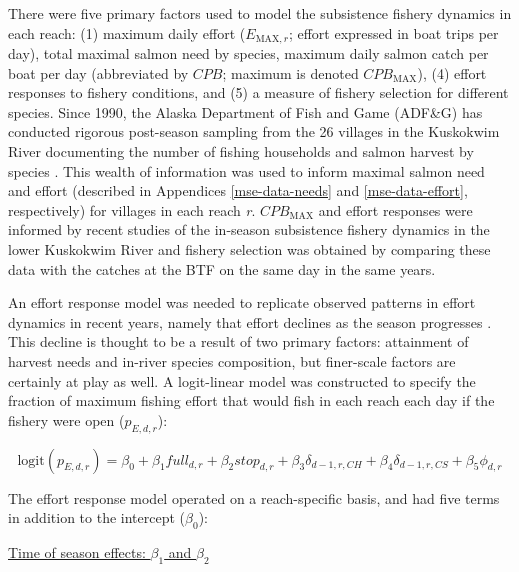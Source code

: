 \documentclass[12pt,]{book}
\theoremstyle{definition}
\theoremstyle{definition}
\theoremstyle{definition}
\theoremstyle{remark}
\begin{document}
\noindent
There were five primary factors used to model the subsistence fishery
dynamics in each reach: (1) maximum daily effort (\(E_{\text{MAX},r}\);
effort expressed in boat trips per day), total maximal salmon need by
species, maximum daily salmon catch per boat per day (abbreviated by
\(CPB\); maximum is denoted \(CPB_{\text{MAX}}\)), (4) effort responses
to fishery conditions, and (5) a measure of fishery selection for
different species. Since 1990, the Alaska Department of Fish and Game
(ADF\&G) has conducted rigorous post-season sampling from the 26
villages in the Kuskokwim River documenting the number of fishing
households and salmon harvest by species \citetext{\citealp[these
estimates are presented
in][]{hamazaki-2011}; \citealp{carroll-hamazaki-2012}; \citealp{shelden-etal-2014}; \citealp{shelden-etal-2015}; \citealp{shelden-etal-2016a}; \citealp[and][]{shelden-etal-2016b}}.
This wealth of information was used to inform maximal salmon need and
effort (described in Appendices \ref{mse-data-needs} and
\ref{mse-data-effort}, respectively) for villages in each reach
\emph{r}. \(CPB_{\text{MAX}}\) and effort responses were informed by
recent studies of the in-season subsistence fishery dynamics in the
lower Kuskokwim River
\citep{staton-coggins-2016, staton-coggins-2017, staton-2018} and
fishery selection was obtained by comparing these data with the catches
at the BTF on the same day in the same years.

An effort response model was needed to replicate observed patterns in
effort dynamics in recent years, namely that effort declines as the
season progresses
\citep{staton-coggins-2016, staton-coggins-2017, staton-2018}. This
decline is thought to be a result of two primary factors: attainment of
harvest needs and in-river species composition, but finer-scale factors
are certainly at play as well. A logit-linear model was constructed to
specify the fraction of maximum fishing effort that would fish in each
reach each day if the fishery were open (\(p_{E,d,r}\)):

\begin{equation}
  \text{logit}(p_{E,d,r})=\beta_0 + \beta_1 full_{d,r} + \beta_2 stop_{d,r} + \beta_3 \delta_{d-1,r,CH} + \beta_4 \delta_{d-1,r,CS} + \beta_5 \phi_{d,r}
  \label{eq:effort-response}
\end{equation}

\noindent
The effort response model operated on a reach-specific basis, and had
five terms in addition to the intercept (\(\beta_0\)):

\noindent
\underline{Time of season effects: $\beta_1$ and $\beta_2$}
\end{document}
